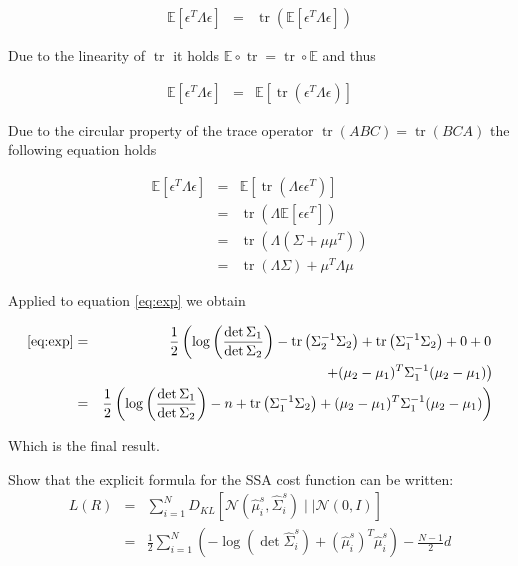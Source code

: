 \documentclass[a4paper, 12pt, titlepage]{article}
\DeclareMathOperator{\tr}{tr}
\begin{document}
\begin{eqnarray}
	\mathbb{E}\left[ \epsilon^T\Lambda\epsilon \right] &=& \tr \left( \mathbb{E}\left[ \epsilon^T\Lambda\epsilon \right] \right)
\end{eqnarray}

Due to the linearity of $\tr$ it holds $\mathbb{E} \circ \tr = \tr \circ \mathbb{E}$ and thus

\begin{eqnarray}
	\mathbb{E}\left[ \epsilon^T\Lambda\epsilon \right] &=& \mathbb{E}\left[ \tr\left(\epsilon^T\Lambda\epsilon\right)  \right]
\end{eqnarray}

Due to the circular property of the trace operator $\tr\left(ABC\right) = \tr\left(BCA\right)$ the following equation holds

\begin{eqnarray}
	\mathbb{E}\left[ \epsilon^T\Lambda\epsilon \right]&=& \mathbb{E}\left[\tr\left(\Lambda\epsilon \epsilon^T\right) \right] \\
	&=& \tr \left( \Lambda \mathbb{E}\left[\epsilon\epsilon^T\right] \right)\\
	&=& \tr\left( \Lambda \left( \Sigma + \mu\mu^T \right) \right)\\
	&=& \tr\left(\Lambda \Sigma\right) + \mu^T\Lambda\mu
\end{eqnarray}

Applied to equation \eqref{eq:exp} we obtain

\begin{eqnarray}
	\eqref{eq:exp} &=& \frac{1}{2} \left( \log\left(\frac{\det\Sigma_1}{\det\Sigma_2} \right) -\tr\left( \Sigma_2^{-1}\Sigma_2 \right) + \tr\left( \Sigma_1^{-1}\Sigma_2 \right) + 0 + 0 \right. \nonumber \\
	&& \left. + (\mu_2-\mu_1)^T\Sigma_1^{-1}(\mu_2-\mu_1)  \right) \\
	&=&\frac{1}{2}\left( \log\left(\frac{\det\Sigma_1}{\det\Sigma_2} \right) -n + \tr\left( \Sigma_1^{-1}\Sigma_2 \right) + (\mu_2-\mu_1)^T\Sigma_1^{-1}(\mu_2-\mu_1)  \right)
\end{eqnarray}

Which is the final result.

Show that the explicit formula for the SSA cost function can be written:
\begin{eqnarray}
	L(R) &=& \sum_{i=1}^N D_{KL}\left[\mathcal{N}(\hat{ \mu}_i^{s}, \hat{ \Sigma}_i^s )\mid \mid \mathcal{N}(0, I) \right]\\
	&=& \frac{1}{2}\sum_{i=1}^N\left(-\log \left( \det \hat{ \Sigma}_i^s \right) + (\hat{ \mu}_i^s)^T\hat{ \mu}_i^s\right) - \frac{N-1}{2}d
\end{eqnarray}
\end{document}
